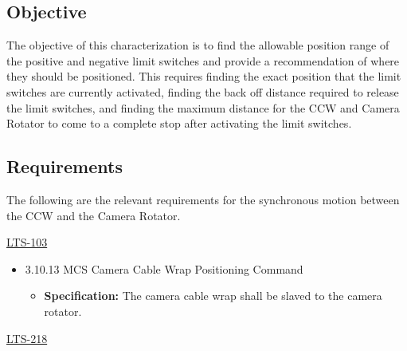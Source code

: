 \documentclass[SE,authoryear,toc]{lsstdoc}
\begin{document}
\subsection{Objective}

The objective of this characterization is to find the allowable position
range of the positive and negative limit switches and provide a
recommendation of where they should be positioned. This requires finding
the exact position that the limit switches are currently activated,
finding the back off distance required to release the limit switches,
and finding the maximum distance for the CCW and Camera Rotator to come
to a complete stop after activating the limit switches.

\subsection{Requirements}

The following are the relevant requirements for the synchronous motion
between the CCW and the Camera Rotator.

\underline{LTS-103}

\begin{itemize}
\item
  3.10.13 MCS Camera Cable Wrap Positioning Command

  \begin{itemize}
  \item
    \textbf{Specification:} The camera cable wrap shall be slaved to the
    camera rotator.
  \end{itemize}
\end{itemize}

\underline{LTS-218}
\end{document}
